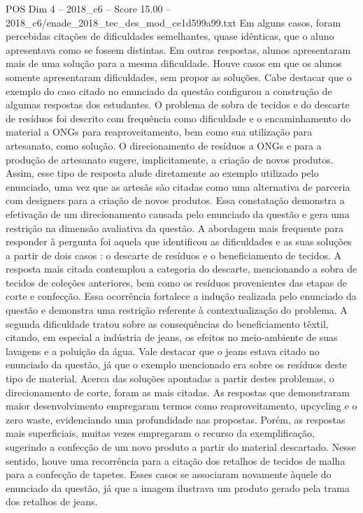 \begin{textsample}{POS Dim 4 – 2018\_c6 – Score 15.00 – 2018\_c6/enade\_2018\_tec\_des\_mod\_ce1d599a99.txt}
Em alguns casos, foram percebidas citações de dificuldades semelhantes, quase idênticas, que o aluno apresentava como se fossem distintas.
Em outras respostas, alunos apresentaram mais de uma solução para a mesma dificuldade.
Houve casos em que os alunos somente apresentaram dificuldades, sem propor as soluções.
Cabe destacar que o exemplo do caso citado no enunciado da questão configurou a construção de algumas respostas dos estudantes.
O problema de sobra de tecidos e do descarte de resíduos foi descrito com frequência como dificuldade e o encaminhamento do material a ONGs para reaproveitamento, bem como sua utilização para artesanato, como solução.
O direcionamento de resíduos a ONGs e para a produção de artesanato sugere, implicitamente, a criação de novos produtos.
Assim, esse tipo de resposta alude diretamente ao exemplo utilizado pelo enunciado, uma vez que as artesãs são citadas como uma alternativa de parceria com designers para a criação de novos produtos.
Essa constatação demonstra a efetivação de um direcionamento causada pelo enunciado da questão e gera uma restrição na dimensão avaliativa da questão.
A abordagem mais frequente para responder à pergunta foi aquela que identificou as dificuldades e as suas soluções a partir de dois casos : o descarte de resíduos e o beneficiamento de tecidos.
A resposta mais citada contemplou a categoria do descarte, mencionando a sobra de tecidos de coleções anteriores, bem como os resíduos provenientes das etapas de corte e confecção.
Essa ocorrência fortalece a indução realizada pelo enunciado da questão e demonstra uma restrição referente à contextualização do problema.
A segunda dificuldade tratou sobre as consequências do beneficiamento têxtil, citando, em especial a indústria de jeans, os efeitos no meio-ambiente de suas lavagens e a poluição da água.
Vale destacar que o jeans estava citado no enunciado da questão, já que o exemplo mencionado era sobre os resíduos deste tipo de material.
Acerca das soluções apontadas a partir destes problemas, o direcionamento de corte, foram as mais citadas.
As respostas que demonstraram maior desenvolvimento empregaram termos como reaproveitamento, upcycling e o zero waste, evidenciando uma profundidade nas propostas.
Porém, as respostas mais superficiais, muitas vezes empregaram o recurso da exemplificação, sugerindo a confecção de um novo produto a partir do material descartado.
Nesse sentido, houve uma recorrência para a citação dos retalhos de tecidos de malha para a confecção de tapetes.
Esses casos se associaram novamente àquele do enunciado da questão, já que a imagem ilustrava um produto gerado pela trama dos retalhos de jeans.

\end{textsample}
